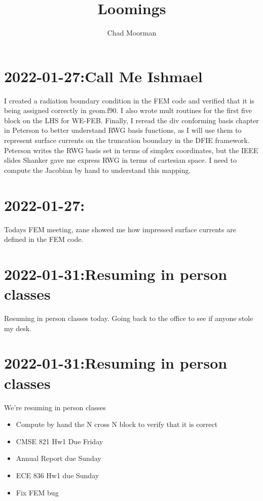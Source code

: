 \documentclass{article}
\author{Chad Moorman}
\title{Loomings}
\begin{document}
\maketitle


\section{2022-01-27:Call Me Ishmael}
I created a radiation boundary condition in the FEM code and verified that it is being assigned correctly in geom.f90.  I also wrote mult routines for the first five block on the LHS for WE-FEB.  Finally, I reread the div conforming basis chapter in Peterson to better understand RWG basis functions, as I will use them to represent surface currents on the truncation boundary in the DFIE framework.  Peterson writes the RWG basis set in terms of simplex coordinates, but the IEEE slides Shanker gave me express RWG in terms of cartesian space.  I need to compute the Jacobian by hand to understand this mapping.
\section{2022-01-27:}
Todays FEM meeting, zane showed me how impressed surface currents are defined in the FEM code.  
\section{2022-01-31:Resuming in person classes}
Resuming in person classes today.  Going back to the office to see if anyone stole my desk.
\section{2022-01-31:Resuming in person classes}
We're resuming in person classes
\begin{itemize}
    \item Compute by hand the N cross N block to verify that it is correct
    \item CMSE 821 Hw1 Due Friday
    \item Annual Report due Sunday
    \item ECE 836 Hw1 due Sunday
    \item Fix FEM bug
\end{itemize}
\end{document}
